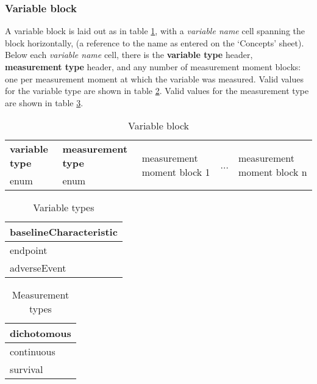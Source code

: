 \documentclass[a4paper,10pt]{article}
\begin{document}
\subsubsection{Variable block}
A variable block is laid out as in table \ref{table:Variable block}, with a \textit{variable name} cell spanning the block horizontally, (a reference to the name as entered on the `Concepts' sheet). Below each \textit{variable name} cell, there is the \textbf{variable type} header, \textbf{measurement type} header, and any number of measurement moment blocks: one per measurement moment at which the variable was measured. Valid values for the variable type are shown in table \ref{table:Variable types}. Valid values for the measurement type are shown in table \ref{table:Measurement types}.

\begin{table}[h!]
  \centering
  \caption{Variable block}
  \small
  \label{table:Variable block}
  \begin{tabular}{|l|l|l|l|l|}
    \hline
    \textbf{variable type} &\textbf{ measurement type} & \multirow{2}{*}{measurement moment block 1} & \multirow{2}{*}{...} &  \multirow{2}{*}{measurement moment block n} \\ \cline{1-2}
    enum & enum & & & \\ \hline
  \end{tabular}
\end{table}

\begin{table}[h!]
  \centering
  \caption{Variable types}
  \small
  \label{table:Variable types}
  \begin{tabular}{|l|}
    \hline
    baselineCharacteristic \\ \hline
    endpoint \\ \hline
    adverseEvent \\ \hline
  \end{tabular}
\end{table}


\begin{table}[h!]
  \centering
  \caption{Measurement types}
  \small
  \label{table:Measurement types}
  \begin{tabular}{|l|}
    \hline
    dichotomous \\ \hline
    continuous \\ \hline
    survival \\ \hline
  \end{tabular}
\end{table}
\end{document}
